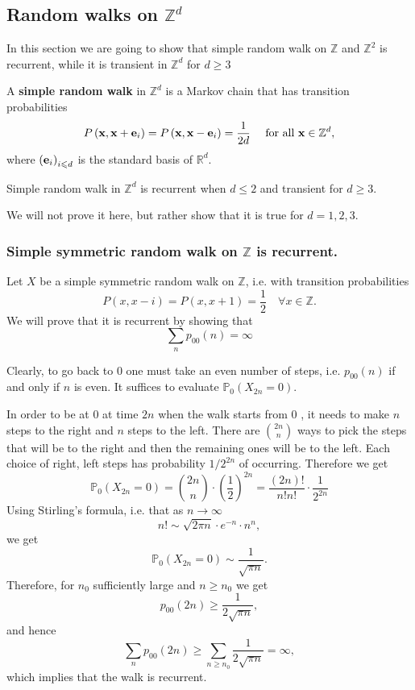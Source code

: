 \documentclass[a4paper]{article}
\begin{document}
\subsection{Random walks on $ \mathbb{Z}^d $}
In this section we are going to show that simple random walk on $\mathbb{Z}$ and $\mathbb{Z}^2$ is recurrent, while it is transient in $\mathbb{Z}^d$ for $d \geq 3$
\begin{definition}
    A \textbf{simple random walk} in $\mathbb{Z}^d$ is a Markov chain that has transition probabilities
    \[
    P\left({\bf x}, {\bf x}+{\bf e}_i\right)=P\left({\bf x}, {\bf x}-{\bf e}_i\right)=\frac{1}{2 d} \quad \text { for all } {\bf x} \in \mathbb{Z}^d,
    \]
    where $\left({\bf e}_i\right)_{i \leqslant d}$ is the standard basis of $\mathbb{R}^d$.
\end{definition}

\begin{theorem}[Polya]
    Simple random walk in $\mathbb{Z}^d$ is recurrent when $d \leq 2$ and transient for $d \geq 3$.
\end{theorem}

We will not prove it here, but rather show that it is true for $d=1,2,3$. 

\subsubsection*{Simple symmetric random walk on $ \mathbb{Z} $ is recurrent.}
Let $X$ be a simple symmetric random walk on $\mathbb{Z}$, i.e. with transition probabilities
\[
P(x, x-i)=P(x, x+1)=\frac{1}{2} \quad \forall x \in \mathbb{Z} .
\]
We will prove that it is recurrent by showing that
\[
\sum_n p_{00}(n)=\infty
\]

Clearly, to go back to 0 one must take an even number of steps, i.e. $p_{00}(n)$ if and only if $n$ is even. It suffices to evaluate $ \mathbb{P}_0(X_{2n}=0) $.

In order to be at 0 at time $2 n$ when the walk starts from 0 , it needs to make $n$ steps to the right and $n$ steps to the left. There are $\binom{2n}{n}$ ways to pick the steps that will be to the right and then the remaining ones will be to the left. Each choice of right, left steps has probability $1/2^{2 n}$ of occurring. Therefore we get
\[
\mathbb{P}_0\left(X_{2 n}=0\right)=\binom{2n}{n} \cdot\left(\frac{1}{2}\right)^{2 n}=\frac{(2 n) !}{n ! n !} \cdot \frac{1}{2^{2 n}}
\]
Using Stirling's formula, i.e. that as $n \rightarrow \infty$
\[
n ! \sim \sqrt{2 \pi n} \cdot e^{-n} \cdot n^n,
\]
we get
\[
\mathbb{P}_0\left(X_{2 n}=0\right) \sim \frac{1}{\sqrt{\pi n}} .
\]
Therefore, for $n_0$ sufficiently large and $n \geq n_0$ we get
\[
p_{00}(2 n) \geq \frac{1}{2 \sqrt{\pi n}},
\]
and hence
\[
\sum_n p_{00}(2 n) \geq \sum_{n \geq n_0} \frac{1}{2 \sqrt{\pi n}}=\infty,
\]
which implies that the walk is recurrent.
\end{document}
